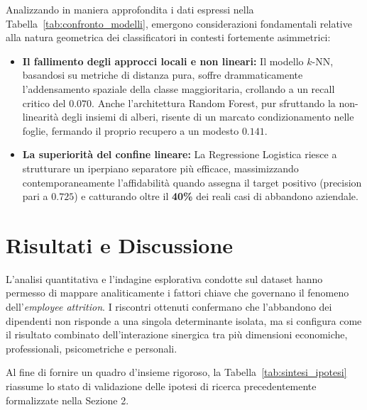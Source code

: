 \documentclass[11pt,a4paper]{article}
\begin{document}
Analizzando in maniera approfondita i dati espressi nella Tabella~\ref{tab:confronto_modelli}, emergono considerazioni fondamentali relative alla natura geometrica dei classificatori in contesti fortemente asimmetrici:
\begin{itemize}
    \item \textbf{Il fallimento degli approcci locali e non lineari:} Il modello $k$-NN, basandosi su metriche di distanza pura, soffre drammaticamente l'addensamento spaziale della classe maggioritaria, crollando a un recall critico del $0.070$. Anche l'architettura Random Forest, pur sfruttando la non-linearità degli insiemi di alberi, risente di un marcato condizionamento nelle foglie, fermando il proprio recupero a un modesto $0.141$.
    \item \textbf{La superiorità del confine lineare:} La Regressione Logistica riesce a strutturare un iperpiano separatore più efficace, massimizzando contemporaneamente l'affidabilità quando assegna il target positivo (precision pari a $0.725$) e catturando oltre il \textbf{40\%} dei reali casi di abbandono aziendale.
\end{itemize}


\section{Risultati e Discussione}
L’analisi quantitativa e l’indagine esplorativa condotte sul dataset hanno permesso di mappare analiticamente i fattori chiave che governano il fenomeno dell’\textit{employee attrition}. I riscontri ottenuti confermano che l’abbandono dei dipendenti non risponde a una singola determinante isolata, ma si configura come il risultato combinato dell'interazione sinergica tra più dimensioni economiche, professionali, psicometriche e personali.

Al fine di fornire un quadro d'insieme rigoroso, la Tabella~\ref{tab:sintesi_ipotesi} riassume lo stato di validazione delle ipotesi di ricerca precedentemente formalizzate nella Sezione 2.
\end{document}
